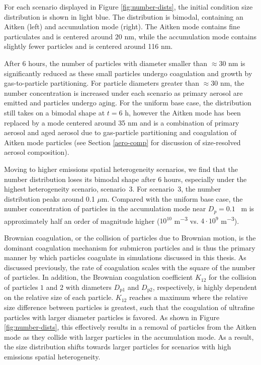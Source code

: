 For each scenario displayed in Figure \ref{fig:number-dists}, the initial condition size distribution is shown in light blue. The distribution is bimodal, containing an Aitken (left) and accumulation mode (right). The Aitken mode contains fine particulates and is centered around $20$ nm, while the accumulation mode contains slightly fewer particles and is centered around 116 nm. 

After 6 hours, the number of particles with diameter smaller than $\approx30$ nm is significantly reduced as these small particles undergo coagulation and growth by gas-to-particle partitioning. For particle diameters greater than $\approx30$ nm, the number concentration is increased under each scenario as primary aerosol are emitted and particles undergo aging. For the uniform base case, the distribution still takes on a bimodal shape at $t=6$ h, however the Aitken mode has been replaced by a mode centered around 35 nm and is a combination of primary aerosol and aged aerosol due to gas-particle partitioning and coagulation of Aitken mode particles (see Section \ref{aero-comp} for discussion of size-resolved aerosol composition). 

Moving to higher emissions spatial heterogeneity scenarios, we find that the number distribution loses its bimodal shape after 6 hours, especially under the highest heterogeneity scenario, scenario~3. For scenario~3, the number distribution peaks around 0.1 $\mu$m. Compared with the uniform base case, the number concentration of particles in the accumulation mode near $D_p = 0.1$ \si{\mu m} is approximately half an order of magnitude higher ($10^{10}$ \si{m^{-3}} vs. $4\cdot10^9$ \si{m^{-3}}).

Brownian coagulation, or the collision of particles due to Brownian motion, is the dominant coagulation mechanism for submicron particles and is thus the primary manner by which particles coagulate in simulations discussed in this thesis.  As discussed previously, the rate of coagulation scales with the square of the number of particles. In addition, the Brownian coagulation coefficient $K_{12}$ for the collision of particles $1$ and $2$ with diameters $D_{\text{p}1}$ and $D_{\text{p}2}$, respectively, is highly dependent on the relative size of each particle. $K_{12}$ reaches a maximum where the relative size difference between particles is greatest, such that the coagulation of ultrafine particles with larger diameter particles is favored. As shown in Figure \ref{fig:number-dists}, this effectively results in a removal of particles from the Aitken mode as they collide with larger particles in the accumulation mode. As a result, the size distribution shifts towards larger particles for scenarios with high emissions spatial heterogeneity.

